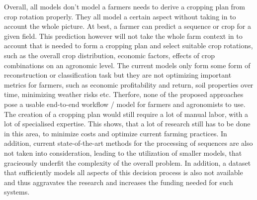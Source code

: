 \documentclass{Academic}
\begin{document}
    Overall, all models don't model a farmers needs to derive a cropping plan from crop rotation properly. They all model a certain aspect without taking in to account the whole picture. At best, a farmer can predict a sequence or crop for a given field. This prediction however will not take the whole farm context in to account that is needed to form a cropping plan and select suitable crop rotations, such as the overall crop distribution, economic factors, effects of crop combinations on an agronomic level. The current models only form some form of reconstruction or classification task but they are not optimizing important metrics for farmers, such as economic profitability and return, soil properties over time, minimizing weather risks etc. Therfore, none of the proposed approaches pose a usable end-to-end workflow / model for farmers and agronomists to use. The creation of a cropping plan would still require a lot of manual labor, with a lot of specialised expertise. This shows, that a lot of research still has to be done in this area, to minimize costs and optimize current farming practices. In addition, current state-of-the-art methods for the processing of sequences are also not taken into consideration, leading to the utilization of smaller models, that gracieously underfit the complexity of the overall problem. In addition, a dataset that sufficiently models all aspects of this decision process is also not available and thus aggravates the research and increases the funding needed for such systems.
\end{document}
